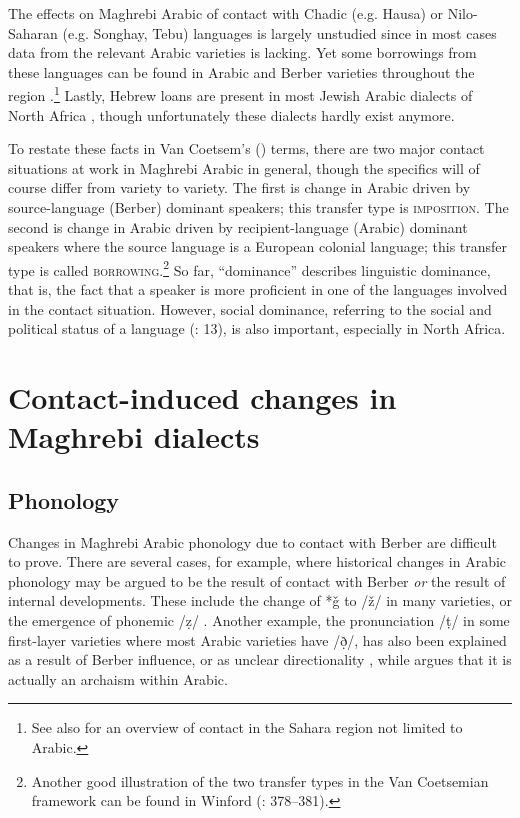 \documentclass[output=paper]{langsci/langscibook}
\begin{document}
  The effects on Maghrebi Arabic of contact with Chadic (e.g. Hausa) or Nilo-Saharan (e.g. Songhay, Tebu) languages is largely unstudied since in most cases data from the relevant Arabic varieties is lacking. Yet some borrowings from these languages can be found in Arabic and Berber varieties throughout the region \citep{Souag2013lexical}.\footnote{See also \citet{Souag2016sahara} for an overview of contact in the Sahara region not limited to Arabic.} Lastly, Hebrew loans are present in most Jewish Arabic dialects of North Africa \citep{Yoda2013}, though unfortunately these dialects hardly exist anymore.
  
  \largerpage

  To restate these facts in Van Coetsem’s (\citeyear{VanCoetsem1988,VanCoetsem2000}) terms, there are two major contact situations at work in Maghrebi Arabic in general, though the specifics will of course differ from variety to variety. The first is change in Arabic driven by source-language (Berber) dominant speakers; this transfer type is \textsc{imposition}. The second is change in Arabic driven by recipient-language (Arabic) dominant speakers where the source language is a European colonial language; this transfer type is called \textsc{borrowing}.\footnote{Another good illustration of the two transfer types in the Van Coetsemian framework can be found in Winford (\citeyear{Winford2005}: 378–381).} So far, ``dominance'' describes linguistic dominance, that is, the fact that a speaker is more proficient in one of the languages involved in the contact situation. However, social dominance, referring to the social and political status of a language (\citealt{VanCoetsem1988}: 13), is also important, especially in North Africa.

\section{ Contact-induced changes in Maghrebi dialects}

\subsection{ Phonology}

Changes in Maghrebi Arabic phonology due to contact with Berber are difficult to prove. There are several cases, for example, where historical changes in Arabic phonology may be argued to be the result of contact with Berber \textit{or} the result of internal developments. These include the change of *ǧ to /ž/ in many varieties, or the emergence of phonemic /ẓ/ \citep{Souag2016sahara}. Another example, the pronunciation /ṭ/ in some first-layer varieties where most Arabic varieties have /ð̣/, has also been explained as a result of Berber influence, or as unclear directionality \citep[187]{Kossmann2013book}, while \citet{Al-Jallad2015Maghreb} argues that it is actually an archaism within Arabic.
\end{document}
